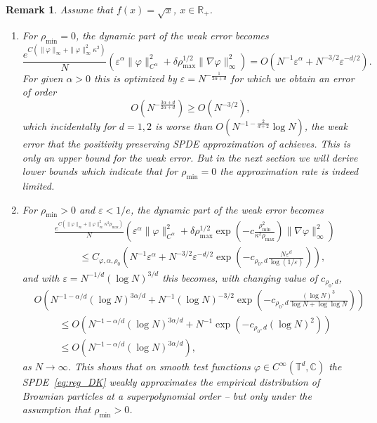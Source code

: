 \documentclass[a4paper,12pt]{article}
\newtheorem{remark}[theorem]{Remark}
\newcommand{\R}{\mathbb{R}}
\newcommand{\T}{\mathbb{T}}
\newcommand{\C}{\mathbb{C}}
\begin{document}
\begin{remark}
Assume that $f(x) = \sqrt{x}$, $x \in \R_+$.
\begin{enumerate}
    \item For $\rho_{\min} = 0$, the dynamic part of the weak error becomes
    \[
        \frac{e^{C (\| \varphi \|_{\infty} + \| \varphi \|_{\infty}^2 \kappa^2)}}{N}
    \left(\varepsilon^{\alpha} \| \varphi \|_{C^{\alpha}}^2 + \delta \rho_{\max}^{1/2} \| \nabla \varphi \|_{\infty}^2\right) = O(N^{-1}\varepsilon^\alpha + N^{-3/2} \varepsilon^{-d/2}).
    \]
    For given $\alpha>0$ this is optimized by $\varepsilon = N^{-\frac{1}{2\alpha+d}}$ for which we obtain an error of order 
    \[
       O(N^{-\frac{3\alpha+d}{2\alpha+d}})
       \geq O(N^{-3/2}),
    \]
   which incidentally for $d=1,2$ is worse than $O(N^{-1-\tfrac{2}{d+2}} \log N)$, the weak error that the positivity preserving SPDE approximation of \cite{Djurdjevac2024} achieves.
    This is only an upper bound for the weak error. But in the next section we will derive lower bounds which indicate that for $\rho_{\min}=0$ the approximation rate is indeed limited.
    \item For $\rho_{\min} > 0$ and $\varepsilon<1/e$, the dynamic part of the weak error becomes
    \begin{align*}
        & \frac{e^{C (\| \varphi \|_{\infty} + \| \varphi \|_{\infty}^2 \kappa^2 \rho_{\max})}}{N}
    \left(\varepsilon^{\alpha} \| \varphi \|_{C^{\alpha}}^2 + \delta \rho_{\max}^{1/2} \exp\left(-c \frac{\rho_{\min}^2}{\kappa^2\rho_{\max}}\right) \| \nabla \varphi \|_{\infty}^2\right) \\
        &\hspace{30pt}\leq C_{\varphi,\alpha,\rho_0}\left( N^{-1} \varepsilon^\alpha + N^{-3/2} \varepsilon^{-d/2}\exp\left(-c_{\rho_0,d} \frac{N \varepsilon^d}{\log(1/\varepsilon)} \right)\right),
    \end{align*}
    and with $\varepsilon = N^{-1/d} (\log N)^{3/d}$ this becomes, with changing value of $c_{\rho_0,d}$, 
    \begin{align*}
        & O\left(N^{-1-\alpha/d}(\log N)^{3\alpha/d} + N^{-1} (\log N)^{-3/2}\exp\left(-c_{\rho_0,d} \frac{(\log N)^{3}}{\log N + \log \log N}\right) \right) \\
        & \hspace{30pt} \leq O\left(N^{-1-\alpha/d} (\log N)^{3\alpha/d} + N^{-1} \exp\left(-c_{\rho_0,d} (\log N)^{2} \right) \right) \\
        & \hspace{30pt} \leq O\left(N^{-1-\alpha/d} (\log N)^{3\alpha/d}\right),
    \end{align*}
    as $N \to \infty$. This shows that on smooth test functions $\varphi \in C^\infty(\T^d,\C)$ the SPDE~\eqref{eq:reg_DK} weakly approximates the empirical distribution of Brownian particles at a superpolynomial order -- but only under the assumption that $\rho_{\min}>0$.
\end{enumerate}
\end{remark}
\end{document}
